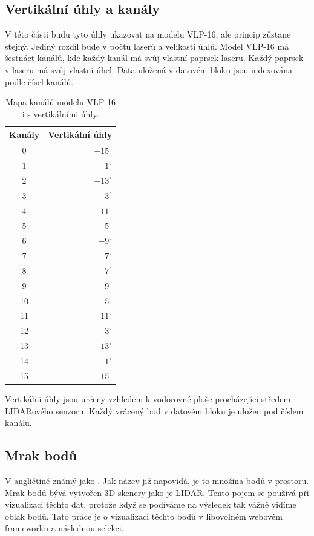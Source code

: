 \documentclass[czech,bachelor,dept420,male,cpdeclaration]{diploma}
\begin{document}
\subsection{Vertikální úhly a kanály}
V této části budu tyto úhly ukazovat na modelu VLP-16, ale princip zůstane stejný. Jediný rozdíl bude v počtu laserů a velikosti úhlů. Model VLP-16 má šestnáct kanálů, kde každý kanál má svůj vlastní paprsek laseru. Každý paprsek v laseru má svůj vlastní úhel. Data uložená v datovém bloku jsou indexována podle čísel kanálů.

\begin{table}[!htbp]
\centering
\caption{Mapa kanálů modelu VLP-16 i s vertikálními úhly.}
\label{tab:tab1}
\begin{tabular}{|c|r|}
\hline
Kanály & Vertikální úhly	\\
\hline
0 &   $-15^\circ$   \\
1 &   $1^\circ$	  \\
2 &   $-13^\circ$  \\
3 &   $-3^\circ$   \\
4 &   $-11^\circ$  \\
5 &   $5^\circ$    \\
6 &   $-9^\circ$   \\
7 &   $7^\circ$    \\
8 &   $-7^\circ$   \\
9 &   $9^\circ$    \\
10 &  $-5^\circ$  \\
11 &  $11^\circ$  \\
12 &  $-3^\circ$  \\
13 &  $13^\circ$  \\
14 &  $-1^\circ$  \\
15 &  $15^\circ$  \\
\hline
\end{tabular}
\end{table}

Vertikální úhly jsou určeny vzhledem k vodorovné ploše procházející středem LIDARového senzoru. Každý vrácený bod v datovém bloku je uložen pod číslem kanálu. 
 
\subsection{Mrak bodů}
V angličtině známý jako . Jak název již napovídá, je to množina bodů v prostoru. Mrak bodů bývá vytvořen 3D skenery jako je LIDAR. Tento pojem se používá při vizualizaci těchto dat, protože když se podíváme na výsledek tak vážně vidíme oblak bodů. Tato práce je o vizualizaci těchto bodů v libovolném webovém frameworku a následnou selekci.
\end{document}
